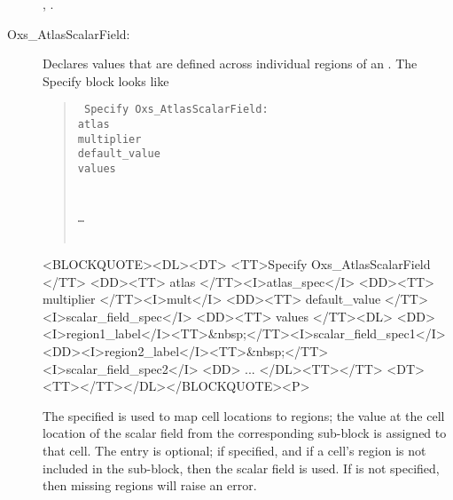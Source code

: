 \begin{description}
\begin{ExampleMifs}
  , .
\end{ExampleMifs}


%
\item[Oxs\_AtlasScalarField:\label{item:AtlasScalarField}]
   Declares values that are defined across individual regions of an
   .  The Specify block looks like
      \begin{latexonly}
      \begin{quote}\tt
      Specify Oxs\_AtlasScalarField: \ocb\\
       \bi atlas \\
       \bi multiplier \\
       \bi default\_value \\
       \bi values \ocb\\
         \bi\bi{}\\
         \bi\bi{}\\
         \bi\bi \ldots\\
       \bi\ccb\\
      \ccb
      \end{quote}
      \end{latexonly}
      \begin{rawhtml}
      <BLOCKQUOTE><DL><DT>
      <TT>Specify Oxs_AtlasScalarField {</TT>
      <DD><TT> atlas </TT><I>atlas_spec</I>
      <DD><TT> multiplier </TT><I>mult</I>
      <DD><TT> default_value </TT><I>scalar_field_spec</I>
      <DD><TT> values {</TT><DL>
          <DD><I>region1_label</I><TT>&nbsp;</TT><I>scalar_field_spec1</I>
          <DD><I>region2_label</I><TT>&nbsp;</TT><I>scalar_field_spec2</I>
          <DD> ...
      </DL><TT>}</TT>
      <DT><TT>}</TT></DL></BLOCKQUOTE><P>
      \end{rawhtml}

   The specified  is used to map cell locations to
   regions; the value at the cell location of the scalar field from the
   corresponding  sub-block is assigned to that cell.
   The  entry is optional; if specified, and if
   a cell's region is not included in the  sub-block, then
   the  scalar field is used.  If 
   is not specified, then missing regions will raise an error.


\end{description}

